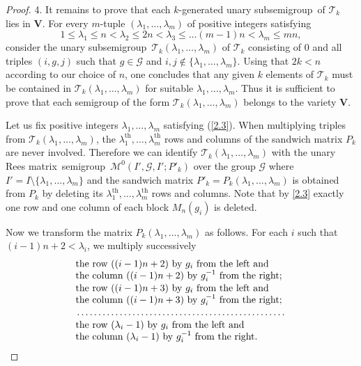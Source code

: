 \documentclass[11pt,reqno]{amsart}
\numberwithin{equation}{section}
\theoremstyle{remark}
\def\cal{\mathcal}
\def\Mc{{\cal M}}
\def\Vc{\mathbf{V}}
\def\la{\lambda}
\def\Rm{Rees matrix}
\def\sm{semi\-group}
\begin{document}
\begin{proof}
\smallskip

4. It remains to prove that each $k$-generated unary sub\sm\ of
$\mathcal{T}_k$ lies in ${\Vc}$. For every $m$-tuple
$(\la_1,\ldots,\la_m)$ of positive integers satisfying
\begin{equation} \label{2.3}
1\leq\la_1\leq n<\la_2\leq 2n<\la_3\leq\ldots (m-1)n <\la_m\leq
mn,
\end{equation}
consider the unary sub\sm \ $\mathcal{T}_k(\la_1,\ldots,\la_m)$ of
$\mathcal{T}_k$ consisting of 0 and all triples $(i,g,j)$ such
that $g\in \mathcal{G}$ and $i,j\not\in\{\la_1,\ldots,\la_m\}$.
Using that $2k<n$ according to our choice of $n$, one concludes
that any given $k$ elements of $\mathcal{T}_k$ must be contained
in $\mathcal{T}_k(\la_1,\ldots,\la_m)$ for suitable
$\la_1,\ldots,\la_m$. Thus it is sufficient to prove that each
semigroup  of the form $\mathcal{T}_k(\la_1,\ldots,\la_m)$ belongs
to the variety ${\Vc}$.

Let us fix positive integers $\la_1,\ldots,\la_m$ satisfying
(\ref{2.3}). When multiplying triples from
$\mathcal{T}_k(\la_1,\ldots,\la_m)$, the
$\la_1^{\mathrm{th}},\dots,\la_m^{\mathrm{th}}$ rows and columns
of the sandwich matrix $P_k$ are never involved. Therefore we can
identify $\mathcal{T}_k(\la_1,\ldots,\la_m)$ with the unary \Rm\
\sm\ $\Mc^0(I',\mathcal{G},I';P'_k)$ over the group $\mathcal{G}$
where $I'=I\setminus\{\la_1,\dots, \la_m\}$ and the sandwich
matrix $P'_k= P_k(\la_1,\ldots,\la_m)$ is obtained from $P_k$ by
deleting its $\la_1^{\mathrm{th}},\dots,\la_m^{\mathrm{th}}$ rows
and columns. Note that by \eqref{2.3} exactly one row and one
column of each block $M_n(g_i)$ is deleted.

Now we transform the matrix $P_k(\la_1,\ldots,\la_m)$ as follows.
For each $i$ such that $(i-1)n+2<\la_i$, we multiply successively
\begin{align}
\label{transform}
&\text{the row $((i-1)n+2)$ by $g_i$ from the left and}\notag\\[-1ex]
&\text{the column $((i-1)n+2)$ by $g_i^{-1}$ from the right;}\notag\\[-.5ex]
&\text{the row $((i-1)n+3)$ by $g_i$ from the left and}\notag\\[-1ex]
&\text{the column $((i-1)n+3)$ by $g_i^{-1}$ from the right;}\\[-.5ex]
&\hbox to 3.0 in{\dotfill }\notag\\[-.5ex]
&\text{the row $(\la_i-1)$ by $g_i$ from the left and}\notag\\[-1ex]
&\text{the column $(\la_i-1)$ by $g_i^{-1}$ from the right.}\notag
\end{align}


\end{proof}
\end{document}
